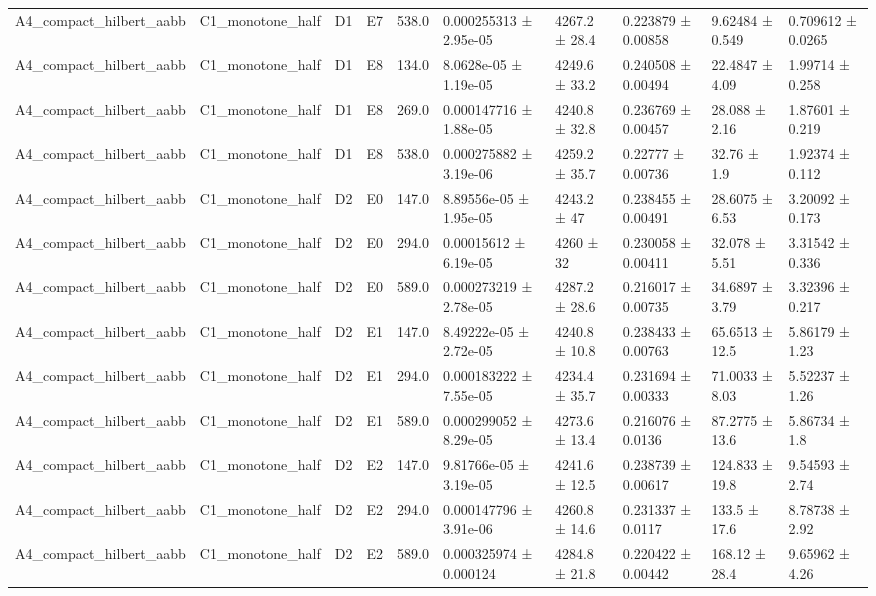 \begin{table}
\begin{tabular}{llllllllll}
A4\_compact\_hilbert\_aabb & C1\_monotone\_half & D1 & E7 & 538.0 & 0.000255313 ± 2.95e-05 & 4267.2 ± 28.4 & 0.223879 ± 0.00858 & 9.62484 ± 0.549 & 0.709612 ± 0.0265 \\
A4\_compact\_hilbert\_aabb & C1\_monotone\_half & D1 & E8 & 134.0 & 8.0628e-05 ± 1.19e-05 & 4249.6 ± 33.2 & 0.240508 ± 0.00494 & 22.4847 ± 4.09 & 1.99714 ± 0.258 \\
A4\_compact\_hilbert\_aabb & C1\_monotone\_half & D1 & E8 & 269.0 & 0.000147716 ± 1.88e-05 & 4240.8 ± 32.8 & 0.236769 ± 0.00457 & 28.088 ± 2.16 & 1.87601 ± 0.219 \\
A4\_compact\_hilbert\_aabb & C1\_monotone\_half & D1 & E8 & 538.0 & 0.000275882 ± 3.19e-06 & 4259.2 ± 35.7 & 0.22777 ± 0.00736 & 32.76 ± 1.9 & 1.92374 ± 0.112 \\
A4\_compact\_hilbert\_aabb & C1\_monotone\_half & D2 & E0 & 147.0 & 8.89556e-05 ± 1.95e-05 & 4243.2 ± 47 & 0.238455 ± 0.00491 & 28.6075 ± 6.53 & 3.20092 ± 0.173 \\
A4\_compact\_hilbert\_aabb & C1\_monotone\_half & D2 & E0 & 294.0 & 0.00015612 ± 6.19e-05 & 4260 ± 32 & 0.230058 ± 0.00411 & 32.078 ± 5.51 & 3.31542 ± 0.336 \\
A4\_compact\_hilbert\_aabb & C1\_monotone\_half & D2 & E0 & 589.0 & 0.000273219 ± 2.78e-05 & 4287.2 ± 28.6 & 0.216017 ± 0.00735 & 34.6897 ± 3.79 & 3.32396 ± 0.217 \\
A4\_compact\_hilbert\_aabb & C1\_monotone\_half & D2 & E1 & 147.0 & 8.49222e-05 ± 2.72e-05 & 4240.8 ± 10.8 & 0.238433 ± 0.00763 & 65.6513 ± 12.5 & 5.86179 ± 1.23 \\
A4\_compact\_hilbert\_aabb & C1\_monotone\_half & D2 & E1 & 294.0 & 0.000183222 ± 7.55e-05 & 4234.4 ± 35.7 & 0.231694 ± 0.00333 & 71.0033 ± 8.03 & 5.52237 ± 1.26 \\
A4\_compact\_hilbert\_aabb & C1\_monotone\_half & D2 & E1 & 589.0 & 0.000299052 ± 8.29e-05 & 4273.6 ± 13.4 & 0.216076 ± 0.0136 & 87.2775 ± 13.6 & 5.86734 ± 1.8 \\
A4\_compact\_hilbert\_aabb & C1\_monotone\_half & D2 & E2 & 147.0 & 9.81766e-05 ± 3.19e-05 & 4241.6 ± 12.5 & 0.238739 ± 0.00617 & 124.833 ± 19.8 & 9.54593 ± 2.74 \\
A4\_compact\_hilbert\_aabb & C1\_monotone\_half & D2 & E2 & 294.0 & 0.000147796 ± 3.91e-06 & 4260.8 ± 14.6 & 0.231337 ± 0.0117 & 133.5 ± 17.6 & 8.78738 ± 2.92 \\
A4\_compact\_hilbert\_aabb & C1\_monotone\_half & D2 & E2 & 589.0 & 0.000325974 ± 0.000124 & 4284.8 ± 21.8 & 0.220422 ± 0.00442 & 168.12 ± 28.4 & 9.65962 ± 4.26 \\

\end{tabular}
\end{table}
